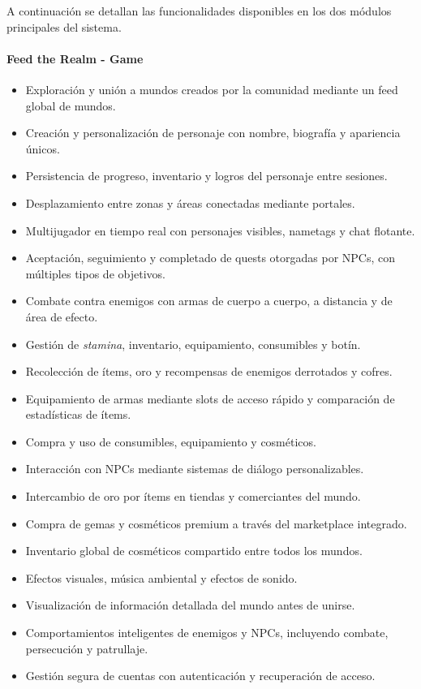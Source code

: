 A continuación se detallan las funcionalidades disponibles en los dos módulos principales del sistema.

\paragraph{Feed the Realm - Game}
\begin{itemize}
  \item Exploración y unión a mundos creados por la comunidad mediante un feed global de mundos.
  \item Creación y personalización de personaje con nombre, biografía y apariencia únicos.
  \item Persistencia de progreso, inventario y logros del personaje entre sesiones.
  \item Desplazamiento entre zonas y áreas conectadas mediante portales.
  \item Multijugador en tiempo real con personajes visibles, nametags y chat flotante.
  \item Aceptación, seguimiento y completado de quests otorgadas por NPCs, con múltiples tipos de objetivos.
  \item Combate contra enemigos con armas de cuerpo a cuerpo, a distancia y de área de efecto.
  \item Gestión de \textit{stamina}, inventario, equipamiento, consumibles y botín.
  \item Recolección de ítems, oro y recompensas de enemigos derrotados y cofres.
  \item Equipamiento de armas mediante slots de acceso rápido y comparación de estadísticas de ítems.
  \item Compra y uso de consumibles, equipamiento y cosméticos.
  \item Interacción con NPCs mediante sistemas de diálogo personalizables.
  \item Intercambio de oro por ítems en tiendas y comerciantes del mundo.
  \item Compra de gemas y cosméticos premium a través del marketplace integrado.
  \item Inventario global de cosméticos compartido entre todos los mundos.
  \item Efectos visuales, música ambiental y efectos de sonido.
  \item Visualización de información detallada del mundo antes de unirse.
  \item Comportamientos inteligentes de enemigos y NPCs, incluyendo combate, persecución y patrullaje.
  \item Gestión segura de cuentas con autenticación y recuperación de acceso.
\end{itemize}

